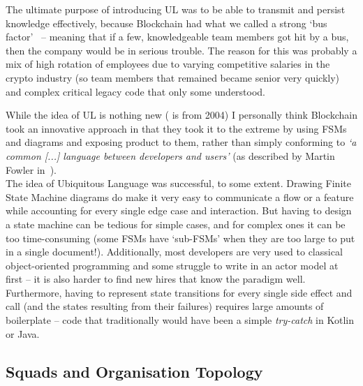 \documentclass[conference]{IEEEtran}
\begin{document}
    \label{para:busFactor}
    The ultimate purpose of introducing UL was to be able to transmit and persist knowledge
    effectively, because Blockchain had what we called a strong `bus
    factor'~\cite{bowlerTruckFactor} -- meaning that if a few, knowledgeable team members got hit by
    a bus, then the company would be in serious trouble.
    The reason for this was probably a mix of high rotation of employees due to varying competitive
    salaries in the crypto industry (so team members that remained became senior very quickly) and
    complex critical legacy code that only some understood.

    While the idea of UL is nothing new (\cite{evansDomainDrivenDesignUL} is from 2004) I personally
    think Blockchain took an innovative approach in that they took it to the extreme by using FSMs
    and diagrams and exposing product to them, rather than simply conforming to \emph{`a common [...]
        language between developers and users'} (as described by Martin Fowler in~\cite{fowlerUL}).\\

    The idea of Ubiquitous Language was successful, to some extent.
    Drawing Finite State Machine diagrams do make it very easy to communicate a flow or a feature while
    accounting for every single edge case and interaction.
    But having to design a state machine can be tedious for simple cases, and
    for complex ones it can be too time-consuming (some FSMs have `sub-FSMs' when they are too large
    to put in a single document!).
    Additionally, most developers are very used to classical object-oriented programming and some
    struggle to write in an actor model at first -- it is also harder to find new hires that know the
    paradigm well.
    Furthermore, having to represent state transitions for every single side effect and call (and the
    states resulting from their failures) requires large amounts of boilerplate -- code that
    traditionally would have been a simple \emph{try-catch} in Kotlin or Java.


    \subsection{Squads and Organisation Topology}\label{subsec:squads}
\end{document}
